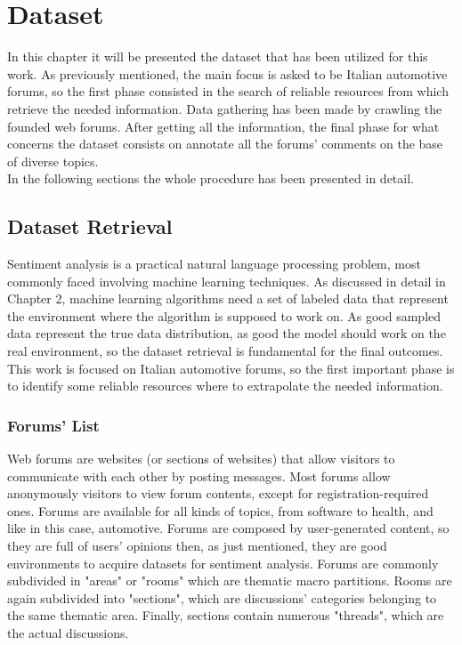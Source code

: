 
\chapter{Dataset}

In this chapter it will be presented the dataset that has been utilized for this work. As previously mentioned, the main focus is asked to be Italian automotive forums, so the first phase consisted in the search of reliable resources from which retrieve the needed information. Data gathering has been made by crawling the founded web forums. After getting all the information, the final phase for what concerns the dataset consists on annotate all the forums' comments on the base of diverse topics. \\
In the following sections the whole procedure has been presented in detail.

\section{Dataset Retrieval}

Sentiment analysis is a practical natural language processing problem, most commonly faced involving machine learning techniques. As discussed in detail in Chapter 2, machine learning algorithms need a set of labeled data that represent the environment where the algorithm is supposed to work on. As good sampled data represent the true data distribution, as good the model should work on the real environment, so the dataset retrieval is fundamental for the final outcomes.\\
This work is focused on Italian automotive forums, so the first important phase is to identify some reliable resources where to extrapolate the needed information. 


\subsection{Forums' List}

Web forums are websites (or sections of websites) that allow visitors to communicate with each other by posting messages. Most forums allow anonymously visitors to view forum contents, except for registration-required ones. Forums are available for all kinds of topics, from software to health, and like in this case, automotive. Forums are composed by user-generated content, so they are full of users' opinions then, as just mentioned, they are good environments to acquire datasets for sentiment analysis. Forums are commonly subdivided in "areas" or "rooms" which are thematic macro partitions. Rooms are again subdivided into "sections", which are discussions' categories belonging to the same thematic area. Finally, sections contain numerous "threads", which are the actual discussions.\\



